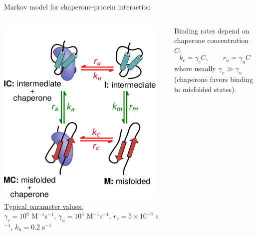 \documentclass{beamer}
\begin{document}
\begin{frame}{Markov model for chaperone-protein interaction}

  \begin{columns}[T]
    \centering
    \includegraphics[width=0.95\textwidth]{markov2.pdf}\\[0.5em]
        {\small{\color{blue} \underline{Typical parameter values:}\\ $\gamma_c = 10^6$ M$^{-1}$s$^{-1}$, $\gamma_u =  10^4$ M$^{-1}$s$^{-1}$, $r_c = 5 \times 10^{-3}$ s$^{-1}$, $k_u = 0.2$ s$^{-1}$}}

     \vspace{0.5in} {\small Binding rates depend on chaperone
    concentration $C$:
    \[
    k_c = \gamma_c C, \qquad r_u = \gamma_u C
    \]
    where usually $\gamma_c \gg \gamma_u$ (chaperone favors binding
    to misfolded states).\\[1em]}
    \end{columns}
\end{frame}
\end{document}
